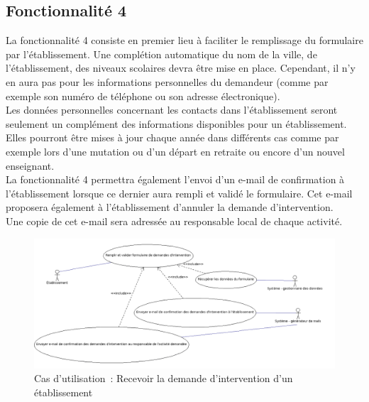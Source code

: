 \subsection{Fonctionnalité 4}
La fonctionnalité 4 consiste en premier lieu à faciliter le remplissage du formulaire par l'établissement. 
Une complétion automatique du nom de la ville, de l'établissement, des niveaux scolaires devra être mise en place. Cependant, il n'y en aura pas pour les informations personnelles du demandeur (comme  par exemple son numéro de téléphone ou son adresse électronique).\\
Les données personnelles concernant les contacts dans l'établissement seront seulement un complément des informations disponibles pour un établissement. Elles pourront être mises à jour chaque année dans différents cas comme par exemple lors d'une mutation ou d'un départ en retraite ou encore d'un nouvel enseignant.   \\

La fonctionnalité 4 permettra également l'envoi d'un e-mail de confirmation à l'établissement lorsque ce dernier aura rempli et validé le formulaire. Cet e-mail proposera également à l'établissement d'annuler la demande d'intervention. \\ Une copie de cet e-mail sera adressée au responsable local de chaque activité.\\
\begin{figure}[H]
	\centering
	\includegraphics[scale=0.4]{images/casDUtilisation/fonctionnalite4ReceptionIntervention.png}
	 \caption{Cas d'utilisation~: Recevoir la demande d'intervention d'un établissement}
	 \label{recevoirDemandesDIntervention}
\end{figure}

